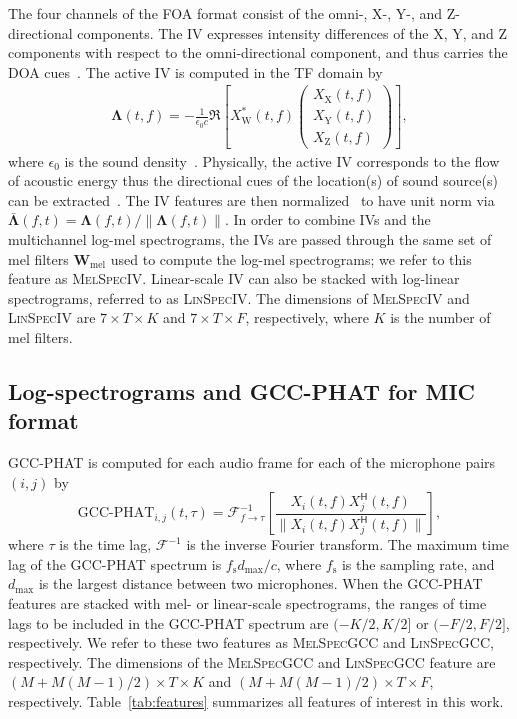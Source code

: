 \documentclass[journal]{IEEEtran}
\newcommand*{\gccphat}{\mbox{GCC-PHAT}\xspace}
\renewcommand{\H}{\mathsf{H}}
\begin{document}
The four channels of the FOA format consist of the \mbox{omni-,} X-, Y-, and Z-directional components. The IV expresses intensity differences of the X, Y, and Z components with respect to the omni-directional component, and thus carries the DOA cues~\cite{Zhao2014UnderdeterminedSensor, Cao2019Two-StageCross-Correlation}. The active IV is computed in the TF domain by
\begin{align}
    \mathbf{\Lambda}(t,f) = -\frac{1}{\epsilon_0 c}\Re\left[ 
    X_\text{W}^{*}(t,f) 
    \begin{pmatrix}
        X_\text{X}(t,f)\\
        X_\text{Y}(t,f)\\
        X_\text{Z}(t,f)
    \end{pmatrix}
    \right],
    \label{eq:iv}
\end{align}
where $\epsilon_0$ is the sound density~\cite{Cao2020Event-independentDetection}. Physically, the active IV corresponds to the flow of acoustic energy thus the directional cues of the location(s) of sound source(s) can be extracted~\cite{Delikaris-Manias2017DOAVectors}. The IV features are then normalized~\cite{Cao2020Event-independentDetection} to have unit norm via $\mathbf{\bar{\Lambda}}(f,t) = \mathbf{\Lambda}(f,t) / \| \mathbf{\Lambda}(f,t) \|$. In order to combine IVs and the multichannel log-mel spectrograms, the IVs are passed through the same set of mel filters $\mathbf{W}_\text{mel}$ used to compute the log-mel spectrograms; we refer to this feature as \textsc{MelSpecIV}. Linear-scale IV can also be stacked with log-linear spectrograms, referred to as \textsc{LinSpecIV}. The dimensions of \textsc{MelSpecIV} and \textsc{LinSpecIV} are $7 \times T \times K$ and $7 \times T \times F$, respectively, where $K$ is the number of mel filters.

\subsection{Log-spectrograms and \gccphat for MIC format}

\gccphat is computed for each audio frame for each of the microphone pairs $(i, j)$ by~\cite{Cao2019PolyphonicStrategy}
\begin{equation}
    \text{GCC-PHAT}_{i,j}(t, \tau) = \mathcal{F}^{-1}_{f\rightarrow \tau}\left[
        \frac{X_i(t,f) X_j^{\H}(t,f)}{\|X_i(t,f) X^{\H}_j(t,f)\|}\right],
    \label{eq:gcc-phat}
\end{equation}
where $\tau$ is the time lag, $\mathcal{F}^{-1}$ is the inverse Fourier transform. The maximum time lag of the \gccphat spectrum is $f_\text{s} d_\text{max}/c$, where $f_\text{s}$ is the sampling rate, and $d_\text{max}$ is the largest distance between two microphones. When the \gccphat features are stacked with mel- or linear-scale spectrograms, the ranges of time lags to be included in the \gccphat spectrum are $(-K/2, K/2]$ or $(-F/2, F/2]$, respectively. We refer to these two features as \textsc{MelSpecGCC} and \textsc{LinSpecGCC}, respectively. The dimensions of the \textsc{MelSpecGCC} and \textsc{LinSpecGCC} feature are $(M + M(M-1)/2) \times T \times K$ and ${(M+M(M-1)/2) \times T \times F}$, respectively. Table~\ref{tab:features} summarizes all features of interest in this work. 
\end{document}
